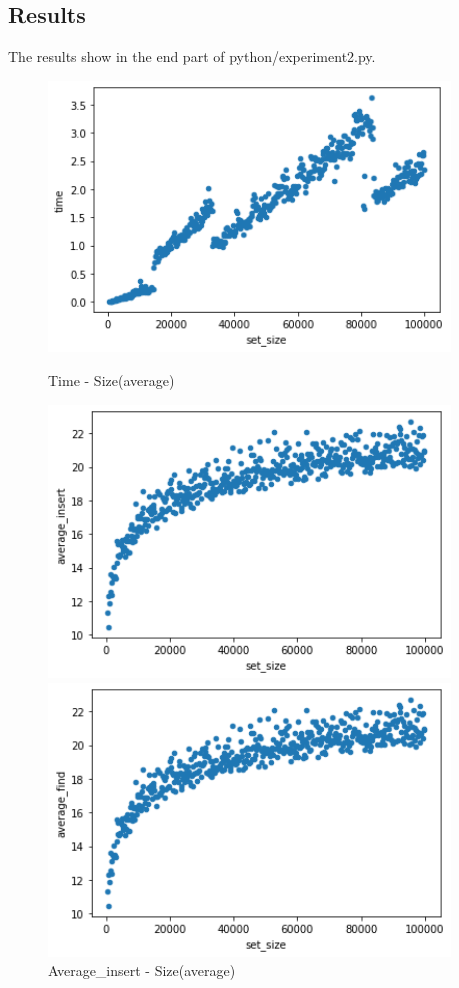 \documentclass[a4]{article}
\begin{document}
\subsection{Results}
The results show in the end part of python/experiment2.py.
\begin{figure}[H]
    \begin{minipage}{0.5\textwidth}        
    \includegraphics[width=0.95\textwidth]{bstree1.png}
    \caption{Time - Size(average)}
    \end{minipage}
    \begin{minipage}{0.5\textwidth}        
    \includegraphics[width=0.95\textwidth]{bstree2.png}
    \caption{Average\_insert - Size(average)}
    \end{minipage}
    \begin{minipage}{0.5\textwidth}        
    \includegraphics[width=0.95\textwidth]{bstree3.png}

\end{minipage}
\end{figure}
\end{document}
